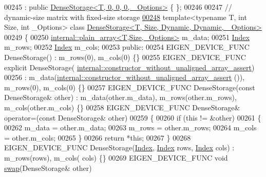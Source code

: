 \begin{DoxyCode}
00245 : \textcolor{keyword}{public} \hyperlink{class_eigen_1_1_dense_storage}{DenseStorage<T, 0, 0, 0, \_Options>} \{ \};
00246 
00247 \textcolor{comment}{// dynamic-size matrix with fixed-size storage}
\hyperlink{class_eigen_1_1_dense_storage_3_01_t_00_01_size_00_01_dynamic_00_01_dynamic_00_01___options_01_4}{00248} \textcolor{keyword}{template}<\textcolor{keyword}{typename} T, \textcolor{keywordtype}{int} Size, \textcolor{keywordtype}{int} \_Options> \textcolor{keyword}{class }
      \hyperlink{class_eigen_1_1_dense_storage_3_01_t_00_01_size_00_01_dynamic_00_01_dynamic_00_01___options_01_4}{DenseStorage<T, Size, Dynamic, Dynamic, \_Options>}
00249 \{
00250     \hyperlink{struct_eigen_1_1internal_1_1plain__array}{internal::plain\_array<T,Size,\_Options>} m\_data;
00251     \hyperlink{namespace_eigen_a62e77e0933482dafde8fe197d9a2cfde}{Index} m\_rows;
00252     \hyperlink{namespace_eigen_a62e77e0933482dafde8fe197d9a2cfde}{Index} m\_cols;
00253   \textcolor{keyword}{public}:
00254     EIGEN\_DEVICE\_FUNC DenseStorage() : m\_rows(0), m\_cols(0) \{\}
00255     EIGEN\_DEVICE\_FUNC \textcolor{keyword}{explicit} DenseStorage(
      \hyperlink{struct_eigen_1_1internal_1_1constructor__without__unaligned__array__assert}{internal::constructor\_without\_unaligned\_array\_assert})
00256       : m\_data(\hyperlink{struct_eigen_1_1internal_1_1constructor__without__unaligned__array__assert}{internal::constructor\_without\_unaligned\_array\_assert}
      ()), m\_rows(0), m\_cols(0) \{\}
00257     EIGEN\_DEVICE\_FUNC DenseStorage(\textcolor{keyword}{const} DenseStorage& other) : m\_data(other.m\_data), m\_rows(other.m\_rows),
       m\_cols(other.m\_cols) \{\}
00258     EIGEN\_DEVICE\_FUNC DenseStorage& operator=(\textcolor{keyword}{const} DenseStorage& other) 
00259     \{ 
00260       \textcolor{keywordflow}{if} (\textcolor{keyword}{this} != &other)
00261       \{
00262         m\_data = other.m\_data;
00263         m\_rows = other.m\_rows;
00264         m\_cols = other.m\_cols;
00265       \}
00266       \textcolor{keywordflow}{return} *\textcolor{keyword}{this}; 
00267     \}
00268     EIGEN\_DEVICE\_FUNC DenseStorage(\hyperlink{namespace_eigen_a62e77e0933482dafde8fe197d9a2cfde}{Index}, \hyperlink{namespace_eigen_a62e77e0933482dafde8fe197d9a2cfde}{Index} rows, \hyperlink{namespace_eigen_a62e77e0933482dafde8fe197d9a2cfde}{Index} cols) : m\_rows(rows), m\_cols(
      cols) \{\}
00269     EIGEN\_DEVICE\_FUNC \textcolor{keywordtype}{void} \hyperlink{endian_8c_a3ca5ecd34b04d6a243c054ac3a57f68d}{swap}(DenseStorage& other)

\end{DoxyCode}
